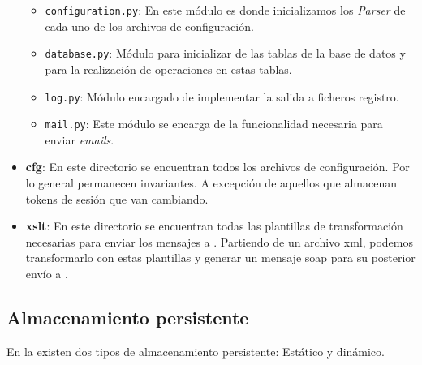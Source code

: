\begin{itemize}
			\begin{itemize}
				\item [\textendash] \texttt{configuration.py}: En este módulo es donde inicializamos los \textit{Parser} de cada uno de los archivos de configuración.
				\item [\textendash] \texttt{database.py}: Módulo para inicializar de las tablas de la base de datos y para la realización de operaciones en estas tablas.
				\item [\textendash] \texttt{log.py}: Módulo encargado de implementar la salida a ficheros registro.
				\item [\textendash] \texttt{mail.py}: Este módulo se encarga de la funcionalidad necesaria para enviar \textit{emails}.
			\end{itemize}
			
	\item[\textendash] \textbf{cfg}: En este directorio se encuentran todos los archivos de configuración. 
	Por lo general permanecen invariantes. A excepción de aquellos que almacenan tokens de sesión que van cambiando.
	\item[\textendash] \textbf{xslt}: En este directorio se encuentran todas las plantillas de transformación necesarias para enviar los mensajes a \wday.
	Partiendo de un archivo xml, podemos transformarlo con estas plantillas y generar un mensaje \acrshort{soap} para su posterior envío a \wday.
	

\end{itemize}




\subsection{Almacenamiento persistente}

En la \iface{} existen dos tipos de almacenamiento persistente: Estático y dinámico.


